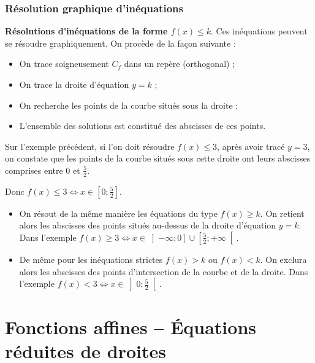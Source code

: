 \documentclass[12pt,a4paper,french]{book}
\begin{document}
 \newpage
 
\subsubsection{Résolution graphique d’inéquations}

\textbf{Résolutions d’inéquations de la forme \( f(x) \leq k \)}. Ces inéquations peuvent se résoudre graphiquement. On procède de la façon suivante :
\begin{itemize}
    \item On trace soigneusement \( C_f \) dans un repère (orthogonal) ;
    \item On trace la droite d’équation \( y = k \) ;
    \item On recherche les points de la courbe situés sous la droite ;
    \item L’ensemble des solutions est constitué des abscisses de ces points.
\end{itemize}

\begin{exemple}
\vspace{3mm}
 Sur l’exemple précédent, si l’on doit résoudre \( f(x) \leq 3 \), après avoir tracé \( y = 3 \), on constate que les points de la courbe situés sous cette droite ont leurs abscisses comprises entre 0 et \( \frac{5}{2} \).

Donc \( f(x) \leq 3 \iff x \in \left[0; \frac{5}{2}\right] \).

\end{exemple}


\begin{rem}
\begin{itemize}
    \item On résout de la même manière les équations du type \( f(x) \geq k \). On retient alors les abscisses des points situés au-dessus de la droite d’équation \( y = k \). Dans l’exemple \( f(x) \geq 3 \iff x \in \left]-\infty; 0\right] \cup \left[\frac{5}{2}; +\infty\right[ \).
    \item De même pour les inéquations strictes \( f(x) > k \) ou \( f(x) < k \). On exclura alors les abscisses des points d’intersection de la courbe et de la droite. Dans l’exemple \( f(x) < 3 \iff x \in \left]0; \frac{5}{2}\right[ \).
\end{itemize}
\end{rem}

\newpage
\section{Fonctions affines – Équations réduites de droites}
\end{document}
